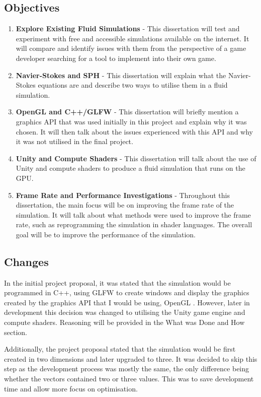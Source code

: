 \documentclass[12pt]{article}
\begin{document}
    \subsection{Objectives}
    \begin{enumerate}
        \item \textbf{Explore Existing Fluid Simulations} - This dissertation will test and experiment with free and accessible simulations available on the internet. It will compare and identify issues with them from the perspective of a game developer searching for a tool to implement into their own game.
        \item \textbf{Navier-Stokes and SPH} - This dissertation will explain what the Navier-Stokes equations are and describe two ways to utilise them in a fluid simulation.
        \item \textbf{OpenGL and C++/GLFW} - This dissertation will briefly mention a graphics API that was used initially in this project and explain why it was chosen. It will then talk about the issues experienced with this API and why it was not utilised in the final project.
        \item \textbf{Unity and Compute Shaders} - This dissertation will talk about the use of Unity and compute shaders to produce a fluid simulation that runs on the GPU.
        \item \textbf{Frame Rate and Performance Investigations} - Throughout this dissertation, the main focus will be on improving the frame rate of the simulation. It will talk about what methods were used to improve the frame rate, such as reprogramming the simulation in shader languages. The overall goal will be to improve the performance of the simulation.
    \end{enumerate}

    \subsection{Changes}
    In the initial project proposal, it was stated that the simulation would be programmed in C++, using GLFW \cite{glfw} to create windows and display the graphics created by the graphics API that I would be using, OpenGL \cite{opengl}. However, later in development this decision was changed to utilising the Unity game engine \cite{unity} and compute shaders. Reasoning will be provided in the What was Done and How section.

    Additionally, the project proposal stated that the simulation would be first created in two dimensions and later upgraded to three. It was decided to skip this step as the development process was mostly the same, the only difference being whether the vectors contained two or three values. This was to save development time and allow more focus on optimisation.
\end{document}
